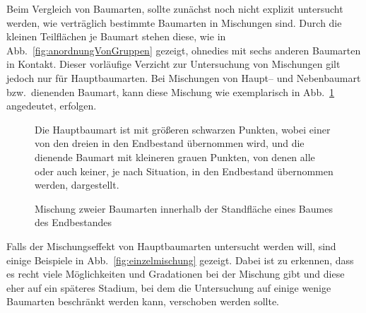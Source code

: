 \documentclass[twocolumn]{scrartcl}
\begin{document}
Beim Vergleich von Baumarten, sollte zunächst noch nicht explizit untersucht
werden, wie verträglich bestimmte Baumarten in Mischungen sind. Durch die
kleinen Teilflächen je Baumart stehen diese, wie in
Abb.~\ref{fig:anordnungVonGruppen} gezeigt, ohnedies mit sechs anderen Baumarten
in Kontakt. Dieser vorläufige Verzicht zur Untersuchung von Mischungen gilt
jedoch nur für Hauptbaumarten. Bei Mischungen von Haupt-- und Nebenbaumart bzw.\
 dienenden Baumart, kann diese Mischung wie exemplarisch in
Abb.~\ref{fig:mischung} angedeutet, erfolgen.

\begin{figure}[htbp]
  \centering
{}
\caption{Mischung zweier Baumarten innerhalb der Standfläche eines Baumes des Endbestandes}
\footnotesize{Die Hauptbaumart ist mit größeren schwarzen Punkten, wobei einer von den dreien in den Endbestand übernommen wird, und die dienende Baumart mit kleineren grauen Punkten, von denen alle oder auch keiner, je nach Situation, in den Endbestand übernommen werden, dargestellt.}
\label{fig:mischung}
\end{figure}

Falls der Mischungseffekt von Hauptbaumarten untersucht werden will, sind einige
Beispiele in Abb.~\ref{fig:einzelmischung} gezeigt. Dabei ist zu erkennen, dass
es recht viele Möglichkeiten und Gradationen bei der Mischung gibt und diese
eher auf ein späteres Stadium, bei dem die Untersuchung auf einige wenige
Baumarten beschränkt werden kann, verschoben werden sollte.
\end{document}
